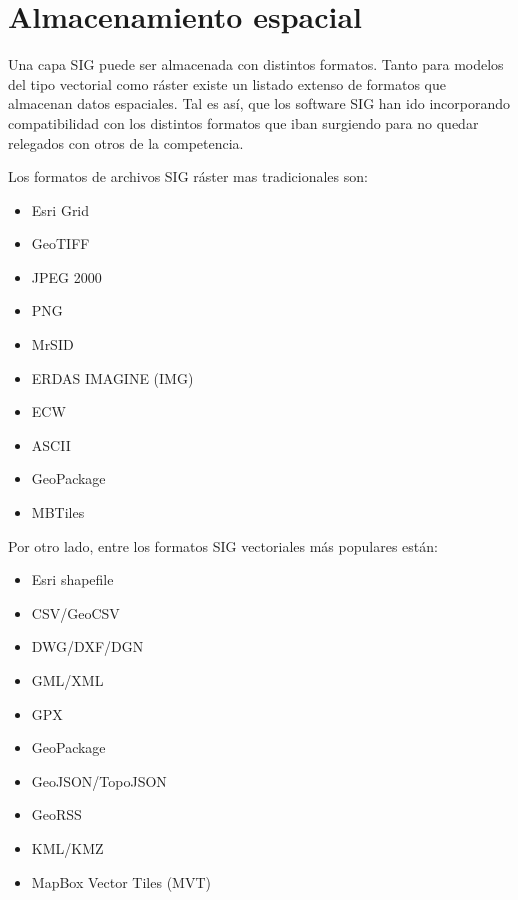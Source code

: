 


\section{Almacenamiento espacial}

Una capa SIG puede ser almacenada con distintos formatos. Tanto para modelos del tipo vectorial como ráster existe un listado extenso de formatos que almacenan datos espaciales. Tal es así, que los software SIG han ido incorporando compatibilidad con los distintos formatos que iban surgiendo para no quedar relegados con otros de la competencia.

Los formatos de archivos SIG ráster mas tradicionales son: 
\begin{itemize}
    \item Esri Grid
    \item GeoTIFF
    \item JPEG 2000
    \item PNG
    \item MrSID
    \item ERDAS IMAGINE (IMG)
    \item ECW
    \item ASCII
    \item GeoPackage
    \item MBTiles
\end{itemize}

Por otro lado, entre los formatos SIG vectoriales más populares están: 
\begin{itemize}
    \item Esri shapefile
    \item CSV/GeoCSV
    \item DWG/DXF/DGN
    \item GML/XML
    \item GPX
    \item GeoPackage
    \item GeoJSON/TopoJSON
    \item GeoRSS
    \item KML/KMZ
    \item MapBox Vector Tiles (MVT)
\end{itemize}

